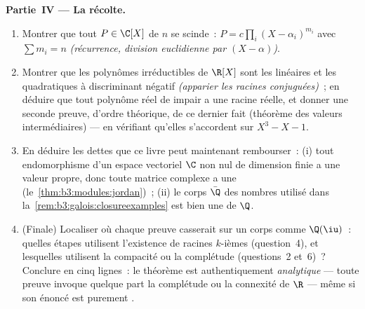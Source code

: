 \begin{problem}
\medskip
\noindent\textbf{Partie~IV --- La récolte.}
\begin{enumerate}[resume]
  \item Montrer que tout $P \in \C[X]$ de  $n$ se
        scinde~: $P = c\prod_{i}(X - \alpha_i)^{m_i}$ avec
        $\sum m_i = n$ \emph{(récurrence, division euclidienne
        par $(X - \alpha)$)}.
  \item Montrer que les polynômes irréductibles de $\R[X]$
        sont les linéaires et les quadratiques à discriminant
        négatif \emph{(apparier les racines conjuguées)}~; en
        déduire que tout polynôme réel de  impair a une
        racine réelle, et donner une seconde preuve, d'ordre
        théorique, de ce dernier fait (théorème des valeurs
        intermédiaires) --- en vérifiant qu'elles
        s'accordent sur $X^3 - X - 1$.
  \item En déduire les dettes que ce livre peut maintenant
        rembourser~: (i) tout endomorphisme d'un espace
        vectoriel $\C$ non nul de dimension finie a une
        valeur propre, donc toute matrice complexe a une
         (le~\cref{thm:b3:modules:jordan})~;
        (ii) le corps $\bar\Q$ des nombres  utilisé
        dans la~\cref{rem:b3:galois:closureexamples} est bien
        une  de $\Q$.
  \item (Finale) Localiser où chaque preuve casserait sur un
        corps comme $\Q(\iu)$~: quelles étapes utilisent
        l'existence de racines $k$-ièmes (question~4), et
        lesquelles utilisent la compacité ou la complétude
        (questions~2 et~6)~? Conclure en cinq lignes~: le
        théorème est authentiquement \emph{analytique} ---
        toute preuve invoque quelque part la complétude ou la
        connexité de $\R$ --- même si son énoncé est purement
        .
\end{enumerate}


\end{problem}
